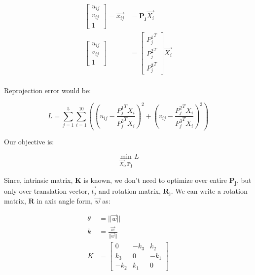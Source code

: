 \documentclass{article}
\begin{document}
\begin{align}
    \begin{bmatrix} u_{ij} \\ v_{ij} \\ 1 \end{bmatrix} = \vec{x_{ij}} &= \mathbf{P_j} \vec{X_i} \\
    \begin{bmatrix} u_{ij} \\ v_{ij} \\ 1 \end{bmatrix} &= \begin{bmatrix}  {P_j^1}^T \\ {P_j^2}^T \\ {P_j^3}^T \end{bmatrix} \vec{X_i} \\
\end{align}

Reprojection error would be:


\begin{equation}
    L = \sum_{j=1}^{5} \sum_{i=1}^{10} \left( \left( u_{ij} - \frac{{P_j^1}^T X_i}{{P_j^3}^T X_i} \right)^2 + \left( v_{ij} - \frac{{P_j^2}^T X_i}{{P_j^3}^T X_i} \right)^2 \right)
\end{equation}

Our objective is:

\begin{equation}
    \min_{\vec{X_i}, \mathbf{P_j}} L
\end{equation}

Since, intrinsic matrix, $\mathbf{K}$ is known, we don't need to optimize over entire $\mathbf{P_j}$, but only over translation vector, $\vec{t_j}$ and rotation matrix, $\mathbf{R_j}$.
We can write a rotation matrix, $\mathbf{R}$ in axis angle form, $\vec{w}$ as:



\begin{align}
    \theta &= ||\vec{w}|| \\
    k &= \frac{\vec{w}}{||\vec{w}||} \\
    K &= \begin{bmatrix} 0 & -k_3 & k_2 \\ k_3 & 0 & -k_1 \\ -k_2 & k_1 & 0 \end{bmatrix}
\end{align}
\end{document}
